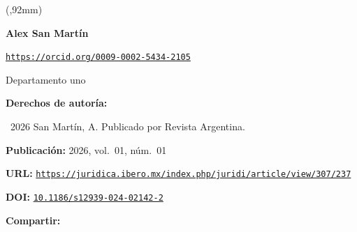 \documentclass{article}
\newlength{\gbbloquex}
\begin{document}
\begin{textblock*}{68mm}(\gbbloquex,92mm)
{\setlength{\leftskip}{0pt}\setlength{\parindent}{0pt}%
\noindent\begin{minipage}[t]{68mm}
\sffamily\small\setlength{\parskip}{1pt}
{\bfseries\color{azulrevista}Alex San Martín}\par
{\scriptsize\texttt{\href{https://orcid.org/0009-0002-5434-2105}{https://orcid.org/0009-0002-5434-2105}}}\par
Departamento uno\par
\vspace{6pt}
{\bfseries\color{azulrevista!70}Derechos de autor\'ia:}\par
\textcopyright\ 2026 San Martín, A. Publicado por Revista Argentina. \par\vspace{6pt}
{\bfseries\color{azulrevista!70}Publicación:} 2026, vol.~01, n\'um.~01\par\vspace{6pt}
{\bfseries\color{azulrevista!70}URL:} {\scriptsize\texttt{\href{https://juridica.ibero.mx/index.php/juridi/article/view/307/237}{https://juridica.ibero.mx/index.php/juridi/article/view/307/237}}}\par\vspace{6pt}
{\bfseries\color{azulrevista!70}DOI:} {\scriptsize\texttt{\href{https://doi.org/10.1186/s12939-024-02142-2}{10.1186/s12939-024-02142-2}}}\par\vspace{6pt}
\vspace{6pt}
{\bfseries\color{azulrevista!70}Compartir:}\par\vspace{3pt}
{\large
\href{https://bsky.app/intent/compose?text=https%3A%2F%2Fjuridica.ibero.mx%2Findex.php%2Fjuridi%2Farticle%2Fview%2F307%2F237}{}~
\href{mailto:?subject=Las%20deudas%20pendientes%20de%20la%20digitalizaci%C3%B3n%20en%20Am%C3%A9rica%20Latina&body=https%3A%2F%2Fjuridica.ibero.mx%2Findex.php%2Fjuridi%2Farticle%2Fview%2F307%2F237}{}~
\href{https://www.facebook.com/sharer/sharer.php?u=https%3A%2F%2Fjuridica.ibero.mx%2Findex.php%2Fjuridi%2Farticle%2Fview%2F307%2F237}{}~
\href{https://www.linkedin.com/sharing/share-offsite/?url=https%3A%2F%2Fjuridica.ibero.mx%2Findex.php%2Fjuridi%2Farticle%2Fview%2F307%2F237}{}~
}
\end{minipage}}
\end{textblock*}
\end{document}
